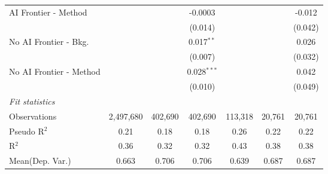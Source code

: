 \begin{tabular}{lcccccc}
   AI Frontier - Method    &               &               & -0.0003       &               &               & -0.012\\   
                           &               &               & (0.014)       &               &               & (0.042)\\   
   No AI Frontier - Bkg.   &               &               & 0.017$^{**}$  &               &               & 0.026\\   
                           &               &               & (0.007)       &               &               & (0.032)\\   
   No AI Frontier - Method &               &               & 0.028$^{***}$ &               &               & 0.042\\   
                           &               &               & (0.010)       &               &               & (0.049)\\   
   \midrule
   \emph{Fit statistics}\\
   Observations            & 2,497,680     & 402,690       & 402,690       & 113,318       & 20,761        & 20,761\\  
   Pseudo R$^2$            & 0.21          & 0.18          & 0.18          & 0.26          & 0.22          & 0.22\\  
   R$^2$                   & 0.36          & 0.32          & 0.32          & 0.43          & 0.38          & 0.38\\  
Mean(Dep. Var.) & 0.663 & 0.706 & 0.706 & 0.639 & 0.687 & 0.687 \\
   

\end{tabular}
